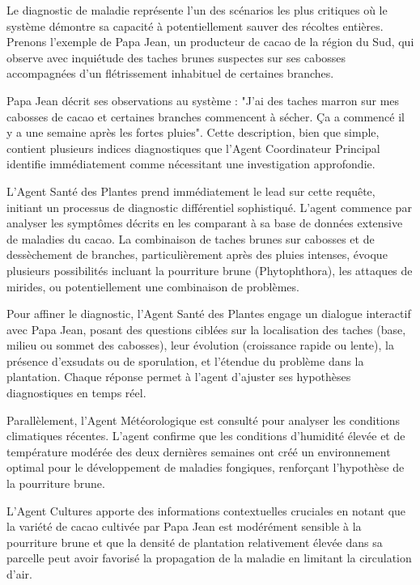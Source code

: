 Le diagnostic de maladie représente l'un des scénarios les plus critiques où le système démontre sa capacité à potentiellement sauver des récoltes entières. Prenons l'exemple de Papa Jean, un producteur de cacao de la région du Sud, qui observe avec inquiétude des taches brunes suspectes sur ses cabosses accompagnées d'un flétrissement inhabituel de certaines branches.

Papa Jean décrit ses observations au système : "J'ai des taches marron sur mes cabosses de cacao et certaines branches commencent à sécher. Ça a commencé il y a une semaine après les fortes pluies". Cette description, bien que simple, contient plusieurs indices diagnostiques que l'Agent Coordinateur Principal identifie immédiatement comme nécessitant une investigation approfondie.

L'Agent Santé des Plantes prend immédiatement le lead sur cette requête, initiant un processus de diagnostic différentiel sophistiqué. L'agent commence par analyser les symptômes décrits en les comparant à sa base de données extensive de maladies du cacao. La combinaison de taches brunes sur cabosses et de dessèchement de branches, particulièrement après des pluies intenses, évoque plusieurs possibilités incluant la pourriture brune (Phytophthora), les attaques de mirides, ou potentiellement une combinaison de problèmes.

Pour affiner le diagnostic, l'Agent Santé des Plantes engage un dialogue interactif avec Papa Jean, posant des questions ciblées sur la localisation des taches (base, milieu ou sommet des cabosses), leur évolution (croissance rapide ou lente), la présence d'exsudats ou de sporulation, et l'étendue du problème dans la plantation. Chaque réponse permet à l'agent d'ajuster ses hypothèses diagnostiques en temps réel.

Parallèlement, l'Agent Météorologique est consulté pour analyser les conditions climatiques récentes. L'agent confirme que les conditions d'humidité élevée et de température modérée des deux dernières semaines ont créé un environnement optimal pour le développement de maladies fongiques, renforçant l'hypothèse de la pourriture brune.

L'Agent Cultures apporte des informations contextuelles cruciales en notant que la variété de cacao cultivée par Papa Jean est modérément sensible à la pourriture brune et que la densité de plantation relativement élevée dans sa parcelle peut avoir favorisé la propagation de la maladie en limitant la circulation d'air.

